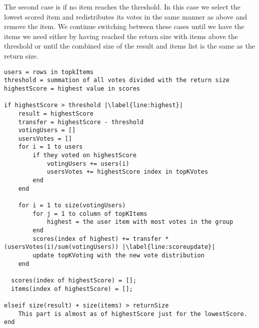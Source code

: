 The second case is if no item reaches the threshold. In this case we select the lowest scored item and redistributes its votes in the same manner as above and remove the item. We continue switching between these cases until we have the items we need either by having reached the return size with items above the threshold or until the combined size of the result and items list is the same as the return size.

\begin{lstlisting}[caption={Implementation for the transfer method},label=lst:BTCtransfer,escapechar=|]
users = rows in topkItems
threshold = summation of all votes divided with the return size
highestScore = highest value in scores

if highestScore > threshold |\label{line:highest}|
	result = highestScore
	transfer = highestScore - threshold
	votingUsers = []
	usersVotes = []
	for i = 1 to users 
		if they voted on highestScore
			votingUsers += users(i)
			usersVotes += highestScore index in topKVotes
		end
	end
		
	for i = 1 to size(votingUsers)
		for j = 1 to column of topKItems
			highest = the user item with most votes in the group
		end
		scores(index of highest) += transfer * (usersVotes(i)/sum(votingUsers)) |\label{line:scoreupdate}|
		update topKVoting with the new vote distribution 
	end
	
  scores(index of highestScore) = [];
  items(index of highestScore) = [];
	
elseif size(result) + size(items) > returnSize
	This part is almost as of highestScore just for the lowestScore.
end

\end{lstlisting}